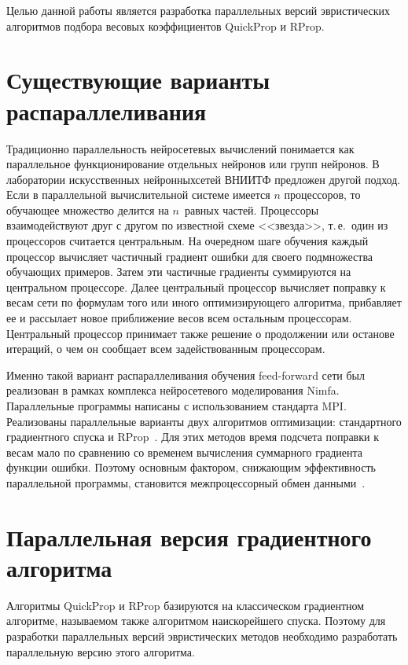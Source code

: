 \begin{multicols}{2}
 Целью данной работы является разработка параллельных версий эвристических
алгоритмов подбора весовых коэффициентов QuickProp и RProp.

\section{Существующие варианты распараллеливания}

 Традиционно параллельность нейросетевых вычислений понимается как
параллельное функ\-цио\-ни\-ро\-ва\-ние отдельных нейронов или групп нейронов. В лаборатории
искусственных нейронных\linebreak сетей ВНИИТФ предложен другой подход. Если в параллельной
вычислительной системе имеется $n$ процессоров, то обучающее множество делится на
$n$~равных частей. Процессоры взаимодействуют друг с другом по известной схеме
<<звезда>>, т.\,е.\ один из процессоров считается центральным. На очередном шаге обучения
каждый процессор вычисляет частичный градиент ошибки для своего подмножества
обучающих примеров. Затем эти частичные градиенты суммируются на центральном
процессоре. Далее центральный процессор вычисляет поправку к весам сети по формулам
того или иного оптимизирующего алгоритма, прибавляет ее и рассылает новое приближение
весов всем остальным процессорам. Центральный процессор принимает также решение о
продолжении или останове итераций, о чем он сообщает всем задействованным
процессорам.

 Именно такой вариант распараллеливания обуче\-ния feed-forward сети был реализован
в рамках комплекса нейросетевого моделирования Nimfa. Параллельные программы
написаны с использованием стандарта MPI. Реализованы параллельные варианты двух
алгоритмов оптимизации: стандартного градиентного спуска и RProp~\cite{12kr}. Для этих
методов время подсчета поправки к весам мало по сравнению со временем вычисления
суммарного градиента функции ошибки. Поэтому основным фактором, снижающим
эффективность параллельной программы, становится межпроцессорный обмен
данными~\cite{5kr}.

\section{Параллельная версия градиентного алгоритма}

 Алгоритмы QuickProp и RProp базируются на классическом градиентном алгоритме,
называемом также алгоритмом наискорейшего спуска. Поэтому для разработки
параллельных версий эвристических методов необходимо разработать параллельную версию
этого алгоритма.


\end{multicols}
